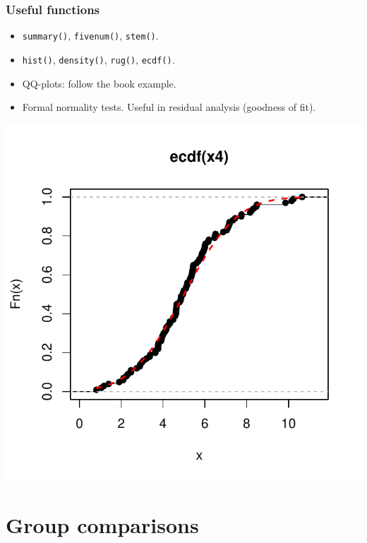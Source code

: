 \begin{frame}[fragile]
  \frametitle{Useful functions}
  \begin{itemize}
  \item \texttt{summary()}, \texttt{fivenum()}, \texttt{stem()}.
  \item \texttt{hist()}, \texttt{density()}, \texttt{rug()},
    \texttt{ecdf()}.
  \item QQ-plots: follow the book example.
  \item Formal normality tests. Useful in residual analysis (goodness of
    fit).
  \end{itemize}
\end{frame}

\begin{frame}[fragile]
\begin{knitrout}\footnotesize
{}\color{fgcolor}\begin{kframe}
\begin{alltt}
 \hlkwb{<-} \hlstd{(}  \hlstd{)}
\hlstd{(}
  \hlstd{,} \hlstd{),} \hlstd{=}\hlstd{,} \hlstd{=}\hlstd{,} \hlstd{=}\hlstd{)}
\end{alltt}
\end{kframe}

{\centering \includegraphics[width=.48\linewidth]{figure/beamer-unnamed-chunk-2-1} 

}



\end{knitrout}
\end{frame}

\section{Group comparisons}

